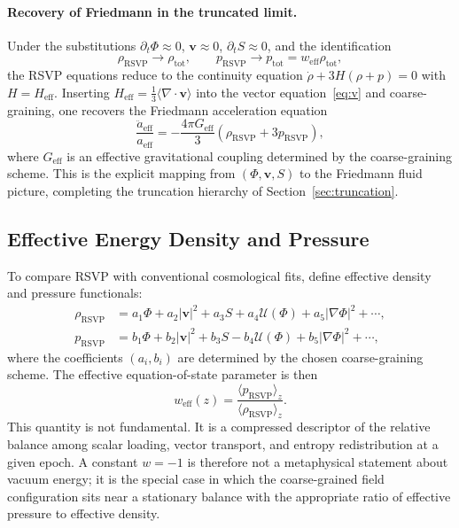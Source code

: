 \documentclass[12pt,a4paper]{article}
\theoremstyle{remark}
\newcommand{\vv}{\mathbf{v}}
\newcommand{\Heff}{H_{\mathrm{eff}}}
\newcommand{\rhoRSVP}{\rho_{\mathrm{RSVP}}}
\newcommand{\pRSVP}{p_{\mathrm{RSVP}}}
\newcommand{\weff}{w_{\mathrm{eff}}}
\begin{document}
\paragraph{Recovery of Friedmann in the truncated limit.}
Under the substitutions $\partial_t\Phi \approx 0$, $\vv \approx 0$,
$\partial_t S \approx 0$, and the identification
\begin{equation}
\rhoRSVP \to \rho_{\mathrm{tot}},
\qquad
\pRSVP \to p_{\mathrm{tot}} = w_{\mathrm{eff}}\rho_{\mathrm{tot}},
\end{equation}
the RSVP equations reduce to the continuity equation
$\dot\rho + 3H(\rho + p) = 0$ with $H = \Heff$.
Inserting $\Heff = \frac{1}{3}\langle\nabla\cdot\vv\rangle$ into the vector
equation~\eqref{eq:v} and coarse-graining, one recovers the Friedmann
acceleration equation
\begin{equation}
\frac{\ddot{a}_{\mathrm{eff}}}{a_{\mathrm{eff}}}
= -\frac{4\pi G_{\mathrm{eff}}}{3}(\rhoRSVP + 3\pRSVP),
\label{eq:friedmann_recovered}
\end{equation}
where $G_{\mathrm{eff}}$ is an effective gravitational coupling determined by
the coarse-graining scheme. This is the explicit mapping from $(\Phi, \vv, S)$
to the Friedmann fluid picture, completing the truncation hierarchy of
Section~\ref{sec:truncation}.

\subsection{Effective Energy Density and Pressure}

To compare RSVP with conventional cosmological fits, define effective density and pressure functionals:
\begin{align}
\rhoRSVP &= a_1 \Phi + a_2 |\vv|^2 + a_3 S + a_4 \mathcal{U}(\Phi) + a_5 |\nabla \Phi|^2 + \cdots, \\
\pRSVP &= b_1 \Phi + b_2 |\vv|^2 + b_3 S - b_4 \mathcal{U}(\Phi) + b_5 |\nabla \Phi|^2 + \cdots,
\end{align}
where the coefficients $(a_i, b_i)$ are determined by the chosen coarse-graining scheme. The effective equation-of-state parameter is then
\begin{equation}
\weff(z) = \frac{\langle \pRSVP \rangle_z}{\langle \rhoRSVP \rangle_z}.
\end{equation}
This quantity is not fundamental. It is a compressed descriptor of the relative balance among scalar loading, vector transport, and entropy redistribution at a given epoch. A constant $w = -1$ is therefore not a metaphysical statement about vacuum energy; it is the special case in which the coarse-grained field configuration sits near a stationary balance with the appropriate ratio of effective pressure to effective density.
\end{document}
